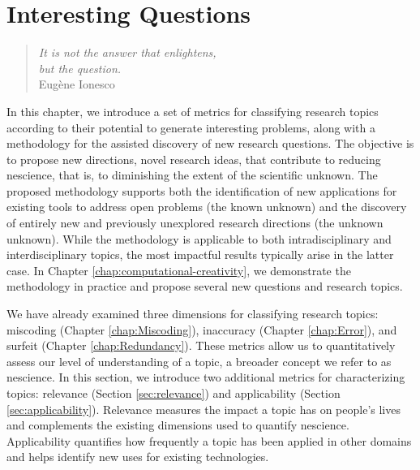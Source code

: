 %
%


\chapter{Interesting Questions}
\label{chap:Interesting-Questions}

\begin{quote}
\begin{flushright}
\emph{It is not the answer that enlightens,\\
but the question. \\}
Eugène Ionesco
\end{flushright}
\end{quote}
\bigskip

In this chapter, we introduce a set of metrics for classifying research topics according to their potential to generate interesting problems, along with a methodology for the assisted discovery of new research questions. The objective is to propose new directions, novel research ideas, that contribute to reducing nescience, that is, to diminishing the extent of the scientific unknown. The proposed methodology supports both the identification of new applications for existing tools to address open problems (the known unknown) and the discovery of entirely new and previously unexplored research directions (the unknown unknown). While the methodology is applicable to both intradisciplinary and interdisciplinary topics, the most impactful results typically arise in the latter case. In Chapter \ref{chap:computational-creativity}, we demonstrate the methodology in practice and propose several new questions and research topics.

We have already examined three dimensions for classifying research topics: miscoding (Chapter \ref{chap:Miscoding}), inaccuracy (Chapter \ref{chap:Error}), and surfeit (Chapter \ref{chap:Redundancy}). These metrics allow us to quantitatively assess our level of understanding of a topic, a breoader concept we refer to as nescience. In this section, we introduce two additional metrics for characterizing topics: relevance (Section \ref{sec:relevance}) and applicability (Section \ref{sec:applicability}). Relevance measures the impact a topic has on people's lives and complements the existing dimensions used to quantify nescience. Applicability quantifies how frequently a topic has been applied in other domains and helps identify new uses for existing technologies.

